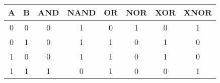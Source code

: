 \renewcommand{\arraystretch}{1.3}
\setlength{\oldtabcolsep}{\tabcolsep}\setlength\tabcolsep{3pt}
\begin{center}
    \begin{tabularx}{0.78\linewidth}{@{}cc|cccccc@{}} %
        \toprule
        A & B & AND & NAND & OR & NOR & XOR & XNOR \\
        \midrule
        0 & 0 & 0   & 1    & 0  & 1   & 0   & 1    \\
        0 & 1 & 0   & 1    & 1  & 0   & 1   & 0    \\
        1 & 0 & 0   & 1    & 1  & 0   & 1   & 0    \\
        1 & 1 & 1   & 0    & 1  & 0   & 0   & 1    \\
        \bottomrule
    \end{tabularx}
\end{center}

\renewcommand{\arraystretch}{1}
\setlength{\tabcolsep}{\oldtabcolsep}


